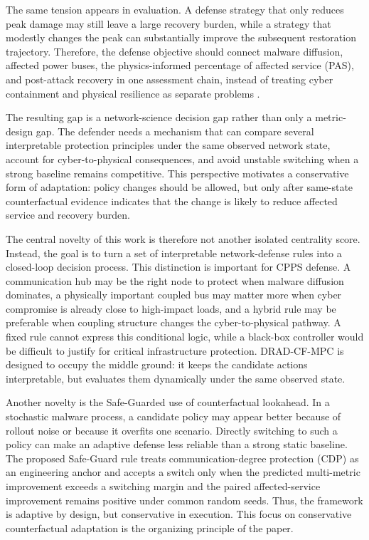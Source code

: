 \documentclass[lettersize,journal]{IEEEtran}
\begin{document}
The same tension appears in evaluation. A defense strategy that only reduces peak damage may still leave a large recovery burden, while a strategy that modestly changes the peak can substantially improve the subsequent restoration trajectory. Therefore, the defense objective should connect malware diffusion, affected power buses, the physics-informed percentage of affected service (PAS), and post-attack recovery in one assessment chain, instead of treating cyber containment and physical resilience as separate problems \cite{li2024review,zhao2024improving}.

The resulting gap is a network-science decision gap rather than only a metric-design gap. The defender needs a mechanism that can compare several interpretable protection principles under the same observed network state, account for cyber-to-physical consequences, and avoid unstable switching when a strong baseline remains competitive. This perspective motivates a conservative form of adaptation: policy changes should be allowed, but only after same-state counterfactual evidence indicates that the change is likely to reduce affected service and recovery burden.

The central novelty of this work is therefore not another isolated centrality score. Instead, the goal is to turn a set of interpretable network-defense rules into a closed-loop decision process. This distinction is important for CPPS defense. A communication hub may be the right node to protect when malware diffusion dominates, a physically important coupled bus may matter more when cyber compromise is already close to high-impact loads, and a hybrid rule may be preferable when coupling structure changes the cyber-to-physical pathway. A fixed rule cannot express this conditional logic, while a black-box controller would be difficult to justify for critical infrastructure protection. DRAD-CF-MPC is designed to occupy the middle ground: it keeps the candidate actions interpretable, but evaluates them dynamically under the same observed state.

Another novelty is the Safe-Guarded use of counterfactual lookahead. In a stochastic malware process, a candidate policy may appear better because of rollout noise or because it overfits one scenario. Directly switching to such a policy can make an adaptive defense less reliable than a strong static baseline. The proposed Safe-Guard rule treats communication-degree protection (CDP) as an engineering anchor and accepts a switch only when the predicted multi-metric improvement exceeds a switching margin and the paired affected-service improvement remains positive under common random seeds. Thus, the framework is adaptive by design, but conservative in execution. This focus on conservative counterfactual adaptation is the organizing principle of the paper.
\end{document}
